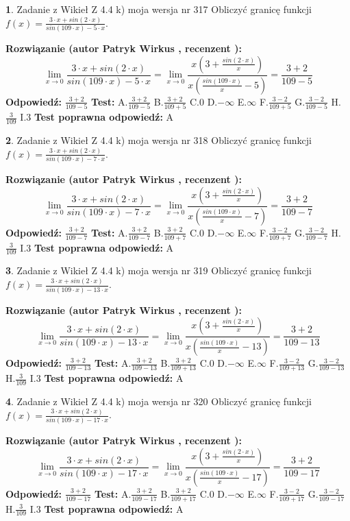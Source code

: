 \documentclass[12pt, a4paper]{article}
\theoremstyle{definition} %
\newtheorem{zad}{}
\newcommand{\zadStart}[1]{\begin{zad}#1\newline}
\newcommand{\zadStop}{\end{zad}}
\newcommand{\rozwStart}[2]{\noindent \textbf{Rozwiązanie (autor #1 , recenzent #2): }\newline}
\newcommand{\rozwStop}{\newline}
\newcommand{\odpStart}{\noindent \textbf{Odpowiedź:}\newline}
\newcommand{\odpStop}{\newline}
\newcommand{\testStart}{\noindent \textbf{Test:}\newline}
\newcommand{\testStop}{\newline}
\newcommand{\kluczStart}{\noindent \textbf{Test poprawna odpowiedź:}\newline}
\newcommand{\kluczStop}{\newline}
\begin{document}
\zadStart{Zadanie z Wikieł Z 4.4 k) moja wersja nr 317}
Obliczyć granicę funkcji $f(x)=\frac{3\cdot x +sin(2\cdot x)}{sin(109\cdot x) -5\cdot x}$.
\zadStop
\rozwStart{Patryk Wirkus}{}
$$\lim\limits_{x\to 0}\frac{3\cdot x +sin(2\cdot x)}{sin(109\cdot x) -5\cdot x}
=\lim\limits_{x\to 0}\frac{x(3+\frac{sin(2\cdot x)}{x})}{x(\frac{sin(109\cdot x)}{x}-5)}
=\frac{3+2}{109-5}$$
\rozwStop
\odpStart
$\frac{3+2}{109-5}$
\odpStop
\testStart
A.$\frac{3+2}{109-5}$
B.$\frac{3+2}{109+5}$
C.$0$
D.$-\infty$
E.$\infty$
F.$\frac{3-2}{109+5}$
G.$\frac{3-2}{109-5}$
H.$\frac{3}{109}$
I.$3$
\testStop
\kluczStart
A
\kluczStop



\zadStart{Zadanie z Wikieł Z 4.4 k) moja wersja nr 318}
Obliczyć granicę funkcji $f(x)=\frac{3\cdot x +sin(2\cdot x)}{sin(109\cdot x) -7\cdot x}$.
\zadStop
\rozwStart{Patryk Wirkus}{}
$$\lim\limits_{x\to 0}\frac{3\cdot x +sin(2\cdot x)}{sin(109\cdot x) -7\cdot x}
=\lim\limits_{x\to 0}\frac{x(3+\frac{sin(2\cdot x)}{x})}{x(\frac{sin(109\cdot x)}{x}-7)}
=\frac{3+2}{109-7}$$
\rozwStop
\odpStart
$\frac{3+2}{109-7}$
\odpStop
\testStart
A.$\frac{3+2}{109-7}$
B.$\frac{3+2}{109+7}$
C.$0$
D.$-\infty$
E.$\infty$
F.$\frac{3-2}{109+7}$
G.$\frac{3-2}{109-7}$
H.$\frac{3}{109}$
I.$3$
\testStop
\kluczStart
A
\kluczStop



\zadStart{Zadanie z Wikieł Z 4.4 k) moja wersja nr 319}
Obliczyć granicę funkcji $f(x)=\frac{3\cdot x +sin(2\cdot x)}{sin(109\cdot x) -13\cdot x}$.
\zadStop
\rozwStart{Patryk Wirkus}{}
$$\lim\limits_{x\to 0}\frac{3\cdot x +sin(2\cdot x)}{sin(109\cdot x) -13\cdot x}
=\lim\limits_{x\to 0}\frac{x(3+\frac{sin(2\cdot x)}{x})}{x(\frac{sin(109\cdot x)}{x}-13)}
=\frac{3+2}{109-13}$$
\rozwStop
\odpStart
$\frac{3+2}{109-13}$
\odpStop
\testStart
A.$\frac{3+2}{109-13}$
B.$\frac{3+2}{109+13}$
C.$0$
D.$-\infty$
E.$\infty$
F.$\frac{3-2}{109+13}$
G.$\frac{3-2}{109-13}$
H.$\frac{3}{109}$
I.$3$
\testStop
\kluczStart
A
\kluczStop



\zadStart{Zadanie z Wikieł Z 4.4 k) moja wersja nr 320}
Obliczyć granicę funkcji $f(x)=\frac{3\cdot x +sin(2\cdot x)}{sin(109\cdot x) -17\cdot x}$.
\zadStop
\rozwStart{Patryk Wirkus}{}
$$\lim\limits_{x\to 0}\frac{3\cdot x +sin(2\cdot x)}{sin(109\cdot x) -17\cdot x}
=\lim\limits_{x\to 0}\frac{x(3+\frac{sin(2\cdot x)}{x})}{x(\frac{sin(109\cdot x)}{x}-17)}
=\frac{3+2}{109-17}$$
\rozwStop
\odpStart
$\frac{3+2}{109-17}$
\odpStop
\testStart
A.$\frac{3+2}{109-17}$
B.$\frac{3+2}{109+17}$
C.$0$
D.$-\infty$
E.$\infty$
F.$\frac{3-2}{109+17}$
G.$\frac{3-2}{109-17}$
H.$\frac{3}{109}$
I.$3$
\testStop
\kluczStart
A
\kluczStop
\end{document}
